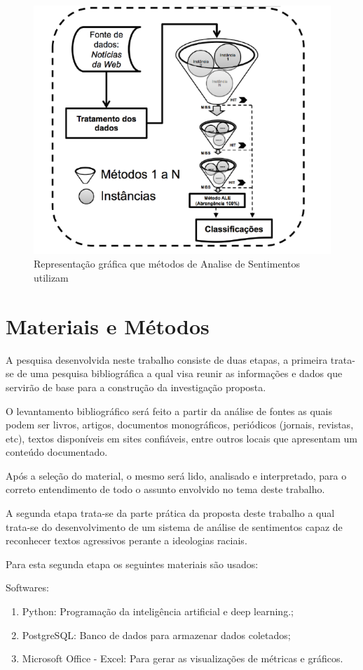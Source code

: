 \documentclass[12pt, a4paper]{article}
\begin{document}
\begin{figure}[H]
\centering
\includegraphics[width=.50\textwidth]{tecnica_de_analise.png}
\caption{Representação gráfica que métodos de Analise de Sentimentos utilizam}
\label{fig:Fig3}
\end{figure}

\newpage
\section{Materiais e Métodos}

A pesquisa desenvolvida neste trabalho consiste de duas etapas, a primeira trata-se de uma pesquisa bibliográfica a qual visa reunir as informações e dados que servirão de base para a construção da investigação proposta.

O levantamento bibliográfico será feito a partir da análise de fontes as quais podem ser livros, artigos, documentos monográficos, periódicos (jornais, revistas, etc), textos disponíveis em sites confiáveis, entre outros locais que apresentam um conteúdo documentado.

Após a seleção do material, o mesmo será lido, analisado e interpretado, para o correto entendimento de todo o assunto envolvido no tema deste trabalho.

A segunda etapa trata-se da parte prática da proposta deste trabalho a qual trata-se do desenvolvimento de um sistema de análise de sentimentos capaz de reconhecer textos agressivos perante a ideologias raciais.

\bigskip 
Para esta segunda etapa os seguintes materiais são usados:

\smallskip
Softwares:

\smallskip
\begin{enumerate}
\item Python: Programação da inteligência artificial e deep learning.;
\item PostgreSQL: Banco de dados para armazenar dados coletados;
\item Microsoft Office - Excel: Para gerar as visualizações de métricas e gráficos.
\end{enumerate}
\end{document}
